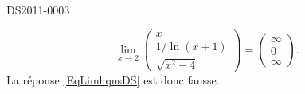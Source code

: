 \begin{corrige}{DS2011-0003}
\begin{enumerate}
            \begin{equation}        \label{EqLimhqnsDS}
                \lim_{x\to 2} \begin{pmatrix}
                    x    \\ 
                    1/\ln(x+1)    \\ 
                    \sqrt{x^2-4}    
                \end{pmatrix}=\begin{pmatrix}
                    \infty\\
                    0\\
                    \infty
                \end{pmatrix}.
            \end{equation}
            La réponse \eqref{EqLimhqnsDS} est donc fausse.
    \end{enumerate}
\end{corrige}
